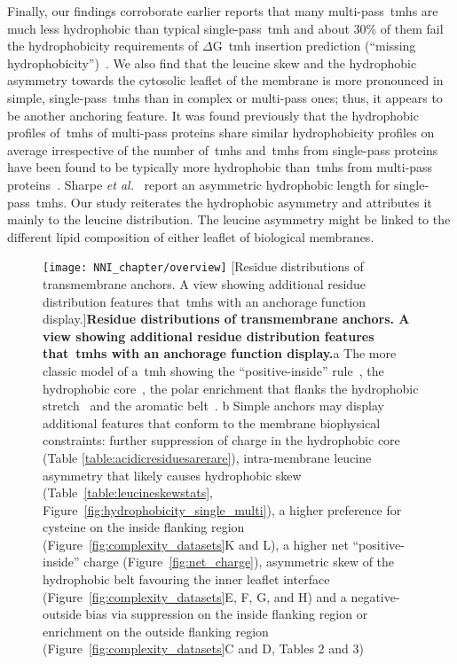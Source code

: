 Finally, our findings corroborate earlier reports that many multi-pass~\gls{tmh}s are much less hydrophobic than typical single-pass~\gls{tmh} and about 30\% of them fail the hydrophobicity requirements of $\Delta$G~\gls{tmh} insertion prediction (``missing hydrophobicity'')~\cite{Hessa2005, Hedin2010, Hessa2007, Ojemalm2012}.
We also find that the leucine skew and the hydrophobic asymmetry towards the cytosolic leaflet of the membrane is more pronounced in simple, single-pass~\gls{tmh}s than in complex or multi-pass ones; thus, it appears to be another anchoring feature.
It was found previously that the hydrophobic profiles of~\gls{tmh}s of multi-pass proteins share similar hydrophobicity profiles on average irrespective of the number of~\gls{tmh}s and~\gls{tmh}s from single-pass proteins have been found to be typically more hydrophobic than~\gls{tmh}s from multi-pass proteins~\cite{Wong2011}.
Sharpe \textit{et al.}~\cite{Sharpe2010} report an asymmetric hydrophobic length for single-pass~\gls{tmh}s.
Our study reiterates the hydrophobic asymmetry and attributes it mainly to the leucine distribution.
The leucine asymmetry might be linked to the different lipid composition of either leaflet of biological membranes.

\begin{figure}[!ht]
\centering
\texttt{[image: NNI\_chapter/overview]}
[Residue distributions of transmembrane anchors.
A view showing additional residue distribution features that~\gls{tmh}s with an anchorage function display.]{\textbf{Residue distributions of transmembrane anchors.
A view showing additional residue distribution features that~\gls{tmh}s with an anchorage function display.}a The more classic model of a~\gls{tmh} showing the ``positive-inside'' rule~\cite{VonHeijne1989}, the hydrophobic core~\cite{Kyte1982}, the polar enrichment that flanks the hydrophobic stretch~\cite{Baeza-Delgado2013} and the aromatic belt~\cite{Granseth2005}.
b Simple anchors may display additional features that conform to the membrane biophysical constraints: further suppression of charge in the hydrophobic core (Table \ref{table:acidicresiduesarerare}), intra-membrane leucine asymmetry that likely causes hydrophobic skew~\cite{Sharpe2010} (Table~\ref{table:leucineskewstats}, Figure~\ref{fig:hydrophobicity_single_multi}), a higher preference for cysteine on the inside flanking region (Figure~\ref{fig:complexity_datasets}K and L), a higher net ``positive-inside'' charge (Figure~\ref{fig:net_charge}), asymmetric skew of the hydrophobic belt favouring the inner leaflet interface (Figure~\ref{fig:complexity_datasets}E, F, G, and H) and a negative-outside bias via suppression on the inside flanking region or enrichment on the outside flanking region (Figure~\ref{fig:complexity_datasets}C and D, Tables 2 and 3)}

\label{fig:overview}
\end{figure}

